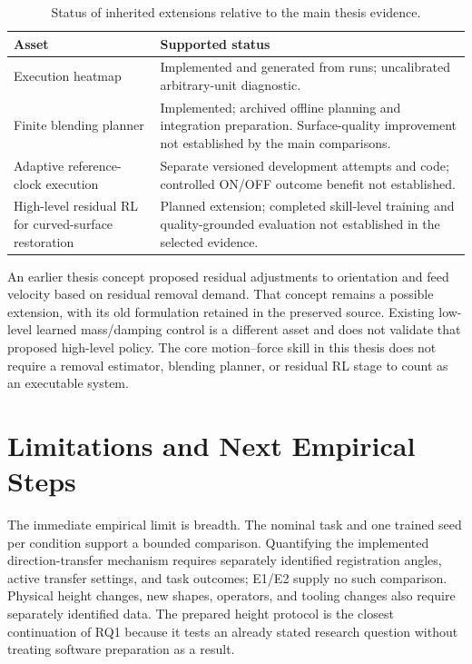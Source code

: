\begin{table}[tbp]\centering\small
\caption[Status of inherited extensions]{Status of inherited extensions relative to the main thesis evidence.}
\label{tab:extension_status}
\begin{tabularx}{\textwidth}{P{0.32\textwidth}X}
\toprule Asset & Supported status \\ \midrule
Execution heatmap & Implemented and generated from runs; uncalibrated arbitrary-unit diagnostic. \\
Finite blending planner & Implemented; archived offline planning and integration preparation. Surface-quality improvement not established by the main comparisons. \\
Adaptive reference-clock execution & Separate versioned development attempts and code; controlled ON/OFF outcome benefit not established. \\
High-level residual RL for curved-surface restoration & Planned extension; completed skill-level training and quality-grounded evaluation not established in the selected evidence. \\
\bottomrule
\end{tabularx}
\end{table}

An earlier thesis concept proposed residual adjustments to orientation and feed velocity based on residual removal demand. That concept remains a possible extension, with its old formulation retained in the preserved source. Existing low-level learned mass/damping control is a different asset and does not validate that proposed high-level policy. The core motion--force skill in this thesis does not require a removal estimator, blending planner, or residual RL stage to count as an executable system.

\section{Limitations and Next Empirical Steps}
The immediate empirical limit is breadth. The nominal task and one trained seed per condition support a bounded comparison. Quantifying the implemented direction-transfer mechanism requires separately identified registration angles, active transfer settings, and task outcomes; E1/E2 supply no such comparison. Physical height changes, new shapes, operators, and tooling changes also require separately identified data. The prepared height protocol is the closest continuation of RQ1 because it tests an already stated research question without treating software preparation as a result.

